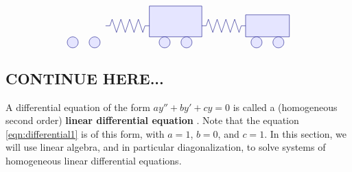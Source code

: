 \begin{solution}
\begin{itemize}
\begin{equation*}
\begin{tikzpicture}[scale=0.8, color=blue!50!black]
\begin{scope}[yshift=-8cm]
\begin{scope}[xshift=0cm]
            \draw[fill=blue!10] (2.5,0.25) circle (0.25);
            \draw[fill=blue!10] (3.5,0.25) circle (0.25);
          \end{scope}
          \begin{scope}[xshift=4.2cm]
            \draw[fill=blue!10] (1.8,0.5) rectangle (4.2,1.9);
            \draw[fill=blue!10] (2.5,0.25) circle (0.25);
            \draw[fill=blue!10] (3.5,0.25) circle (0.25);
          \end{scope}
          \begin{scope}[xshift=8.4cm]
            \draw[fill=blue!10] (2,0.5) rectangle (4,1.5);
            \draw[fill=blue!10] (2.5,0.25) circle (0.25);
            \draw[fill=blue!10] (3.5,0.25) circle (0.25);
          \end{scope}
          \begin{scope}[xshift=4cm]
            \draw (0,1) -- ++(0.2,0) -- ++(0.1,0.3)
            -- ++(0.2,-0.6) -- ++(0.2,0.6)
            -- ++(0.2,-0.6) -- ++(0.2,0.6)
            -- ++(0.2,-0.6) -- ++(0.2,0.6)
            -- ++(0.2,-0.6) -- ++(0.1,0.3)
            -- ++(0.2,0);
          \end{scope}
          \begin{scope}[xshift=8.4cm]
            \draw (0,1) -- ++(0.2,0) -- ++(0.1,0.3)
            -- ++(0.2,-0.6) -- ++(0.2,0.6)
            -- ++(0.2,-0.6) -- ++(0.2,0.6)
            -- ++(0.2,-0.6) -- ++(0.2,0.6)
            -- ++(0.2,-0.6) -- ++(0.1,0.3)
            -- ++(0.2,0);
          \end{scope}
        \end{scope}
      \end{tikzpicture}
    \end{equation*}
  \end{itemize}
\end{solution}

\subsection{CONTINUE HERE...}

  A
differential equation of the form $ay''+by'+cy = 0$ is called a
(homogeneous second order) \textbf{linear differential equation}%
. Note
that the equation {\eqref{eqn:differential1}} is of this form, with
$a=1$, $b=0$, and $c=1$. In this section, we will use linear algebra,
and in particular diagonalization, to solve systems of homogeneous
linear differential equations.


